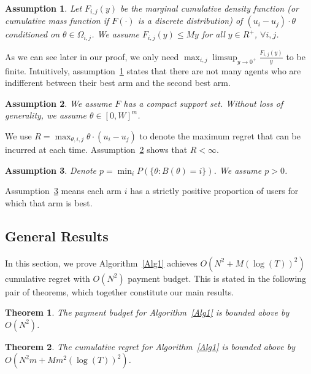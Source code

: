 \documentclass{article}
\newtheorem{theorem}{Theorem}
\newtheorem{assumption}{Assumption}
\begin{document}
\begin{assumption} Let $F_{i,j}(y)$ be the marginal cumulative density function (or cumulative mass function if $F(\cdot)$ is a discrete distribution) of $(u_i-u_j)\cdot\theta$ conditioned on $\theta \in \Omega_{i,j}$. We assume $F_{i,j}(y)\leq My$ for all $y\in R^{+}$, $\forall i,j$. 
\label{A1}
\end{assumption}

As we can see later in our proof, we only need $\max_{i,j}\limsup_{y\rightarrow 0^{+}}\frac{F_{i,j}(y)}{y}$ to be finite. Intuitively, assumption~\ref{A1} states that there are not many agents who are indifferent between their best arm and the second best arm. 

\begin{assumption} We assume $F$ has a compact support set. Without loss of generality, we assume $\theta\in [0,W]^m$.
\label{A2}
\end{assumption}

We use $R = \max_{\theta, i,j} \theta \cdot (u_i - u_j)$ to denote the maximum regret that can be incurred at each time.  Assumption~\ref{A2} shows that $R<\infty$.

\begin{assumption}
Denote $p=\min_{i}P(\{\theta: B(\theta)=i\})$. We assume $p>0$.
\label{A3}
\end{assumption}

Assumption~\ref{A3} means each arm $i$ has a strictly positive proportion of users for which that arm is best. 


\subsection{General Results}

In this section, we prove Algorithm~\ref{Alg1} achieves $O(N^2+M(\log(T))^2)$ cumulative regret with $O(N^2)$ payment budget.  This is stated in the following pair of theorems, which together constitute our main results.

\begin{theorem}
The payment budget for Algorithm~\ref{Alg1} is bounded above by $O(N^2)$. 
\label{rst:budget}
\end{theorem}


\begin{theorem}
The cumulative regret for Algorithm~\ref{Alg1} is bounded above by $O(N^2 m + M m^2(\log(T))^2)$.
\label{rst:regret}
\end{theorem}
\end{document}
